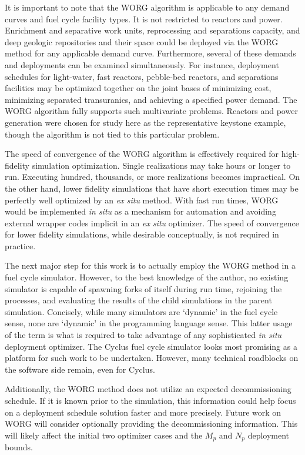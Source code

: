 It is important to note that the WORG algorithm is applicable to any
demand curves and fuel cycle facility types. It is not restricted to
reactors and power. Enrichment and separative work units, reprocessing
and separations capacity, and deep geologic repositories and their
space could be deployed via the WORG method for any applicable demand
curve. Furthermore, several of these demands and deployments can be
examined simultaneously. For instance, deployment schedules for light-water,
fast reactors, pebble-bed reactors, and separations facilities may be optimized
together on the joint
bases of minimizing cost, minimizing separated transuranics, and achieving
a specified power demand. The WORG algorithm fully supports such multivariate
problems. Reactors and power generation were chosen for study here as the
representative keystone example, though the algorithm is not tied to this
particular problem.

The speed of convergence of the WORG algorithm is effectively required for
high-fidelity simulation optimization. Single realizations may take hours or
longer to run. Executing hundred, thousands, or more realizations becomes
impractical. On the other hand, lower fidelity simulations that have short
execution times may be perfectly well optimized by an \emph{ex situ}
method. With fast run times, WORG would be implemented \emph{in situ} as
a mechanism for automation and avoiding external wrapper codes implicit
in an \emph{ex situ} optimizer. The speed of convergence for lower fidelity
simulations, while desirable conceptually, is not required in practice.

The next major step for this work is to actually employ the WORG method in
a fuel cycle simulator.  However, to the best knowledge of the
author, no existing simulator is capable of spawning forks of itself
during run time, rejoining the processes, and evaluating the results of the
child simulations in the parent simulation. Concisely, while many simulators
are `dynamic' in the fuel cycle sense, none are `dynamic' in the programming
language sense. This latter usage of the term is what is required to
take advantage of any sophisticated \emph{in situ} deployment optimizer.
The Cyclus fuel cycle simulator looks most promising as a platform
for such work to be undertaken. However, many technical roadblocks
on the software side remain, even for Cyclus.

Additionally, the WORG method does not utilize an expected decommissioning
schedule. If it is known prior to the simulation, this information
could help focus on a deployment schedule solution faster and more precisely.
Future work on WORG will consider optionally providing the decommissioning information.
This will likely affect the initial two optimizer cases and the
$M_p$ and $N_p$ deployment bounds.


